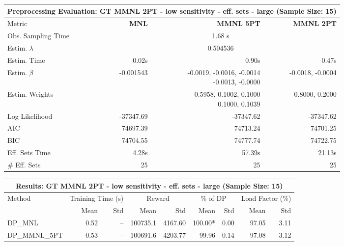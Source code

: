 
\begin{samepage}
\begin{center}
  \small
  \begin{tabular}{l|r|r|r}
    \toprule
    \multicolumn{4}{c}{\textbf{Preprocessing Evaluation: GT MMNL 2PT - low sensitivity - eff. sets - large (Sample Size: 15)}} \\
    \midrule
    Metric & \textbf{MNL} & \textbf{MMNL 5PT} & \textbf{MMNL 2PT} \\
    \midrule
    Obs. Sampling Time & \multicolumn{3}{c}{1.68 s} \\
    Estim. $\lambda$ & \multicolumn{3}{c}{0.504536} \\
    Estim. Time & 0.02s & 0.90s & 0.47s \\
    Estim. $\beta$ & -0.001543 & \makecell[tr]{-0.0019, -0.0016, -0.0014 \\ -0.0013, -0.0000} & -0.0018, -0.0004 \\
    Estim. Weights & - & \makecell[tr]{0.5958, 0.1002, 0.1000 \\ 0.1000, 0.1039} & 0.8000, 0.2000 \\
    Log Likelihood & -37347.69 & -37347.62 & -37347.62 \\
    AIC & 74697.39 & 74713.24 & 74701.25 \\
    BIC & 74704.55 & 74777.74 & 74722.75 \\
    Eff. Sets Time & 4.28s & 57.39s & 21.13s \\
    \# Eff. Sets & 25 & 25 & 25 \\
    \bottomrule
  \end{tabular}
\end{center}
\begin{center}
  \small
  \begin{tabular}{l|rr|rr|rr|rr}
    \toprule
    \multicolumn{9}{c}{\textbf{Results: GT MMNL 2PT - low sensitivity - eff. sets - large (Sample Size: 15)}} \\
    \midrule
    Method & \multicolumn{2}{c|}{Training Time (s)} & \multicolumn{2}{c|}{Reward} & \multicolumn{2}{c|}{\% of DP} & \multicolumn{2}{c}{Load Factor (\%)} \\
    & Mean & Std & Mean & Std & Mean & Std & Mean & Std \\
    \midrule
    DP\_MNL      &     0.52 &    -- &   100735.1 &    4167.60 & 100.00* &    0.00 &   97.05 &    3.11 \\
    DP\_MMNL\_5PT &     0.53 &    -- &   100691.6 &    4203.77 &   99.96 &    0.14 &   97.08 &    3.12 \\

\end{tabular}
\end{center}
\end{samepage}
